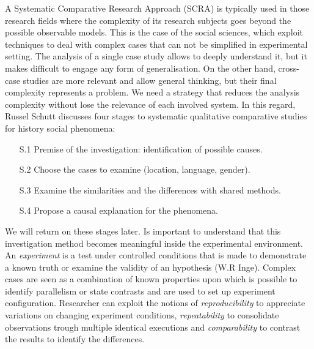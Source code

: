 A Systematic Comparative Research Approach (SCRA) is typically used in those research fields where the complexity of its research subjects goes beyond the possible observable models. This is the case of the social sciences, which exploit techniques to deal with complex cases that can not be simplified in experimental setting. The analysis of a single case study allows to deeply understand it, but it makes difficult to engage any form of generalisation. On the other hand, cross-case studies are more relevant and allow general thinking, but their final complexity represents a problem. We need a strategy that reduces the analysis complexity without lose the relevance of each involved system. In this regard, Russel Schutt discusses four stages to systematic qualitative comparative studies for history social phenomena:
\begin{enumerate}
\item[S.1] Premise of the investigation: identification of possible causes.
\item[S.2] Choose the cases to examine (location, language, gender).
\item[S.3] Examine the similarities and the differences with shared methods.
\item[S.4] Propose a causal explanation for the phenomena.
\end{enumerate} We will return on these stages later. Is important to understand that this investigation method becomes meaningful inside the experimental environment. An \textit{experiment} is a test under controlled conditions that is made to demonstrate a known truth or examine the validity of an hypothesis (W.R Inge). Complex cases are seen as a combination of known properties upon which is possible to identify parallelism or state contrasts and are used to set up experiment configuration. Researcher can exploit the notions of \textit{reproducibility} to appreciate variations on changing experiment conditions, \textit{repeatability} to consolidate observations trough multiple identical executions and \textit{comparability} to contrast the results to identify the differences.

